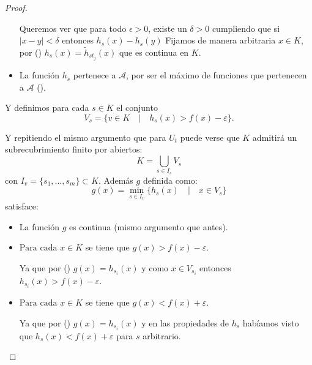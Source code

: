 \begin{proof}
\begin{itemize}
        Queremos ver que para todo $\epsilon > 0$, existe un $\delta >0$ cumpliendo que 
        si $ |x-y| < \delta$ entonces $h_s(x)-h_s(y)$
        Fijamos de manera arbitraria $x \in K$, 
        por 
        () 
        $h_s(x) =  \tilde{h}_{s t_j}(x)$ que es continua en $K$. 

        \item La función $h_s$ pertenece a $\mathcal{A}$, por ser el máximo de funciones que pertenecen a $\mathcal{A}$ (). 
    \end{itemize} 
     

    Y definimos para cada $s \in K$ el conjunto 
    \begin{equation}\label{subrecubrimiento_s}
        V_s = \{
            v \in K  \quad |  \quad
            h_s(x) > f(x) - \varepsilon
            \}.
    \end{equation} 

    Y repitiendo el mismo argumento que para $U_t$ puede verse que $K$ admitirá un 
    subrecubrimiento finito por abiertos: 
    \begin{equation*}
        K = \bigcup_{s \in I_s} V_s
    \end{equation*}
    con $I_v = \{s_1, \ldots, s_m\} \subset K$. 
    Además $g$ definida como: 
    \begin{equation}
        g(x)= \min_{s \in I_v}
        \{ 
            h_{s}(x) 
            \quad | \quad
            x \in V_s
        \} 
    \end{equation}
    satisface:  
    \begin{itemize}
        \item La función $g$ es continua (mismo argumento que antes). 
        \item $\text{Para cada } x \in K$ se tiene que $g(x) >f(x) - \varepsilon$.
        
        Ya que por 
        () 
        $g(x) =  h_{s_i}(x)$ y 
        como $x \in V_{s_i}$ entonces 
        $h_{s_i}(x) > f(x) -\varepsilon$.
        \item $\text{Para cada } x \in K$ se tiene que $g(x) <f(x) +\varepsilon$.
        
        Ya que por 
        () 
        $g(x) =  h_{s_i}(x)$ y 
        en las propiedades de $h_s$ habíamos visto que
        $h_{s}(x) < f(x) +\varepsilon$ para $s$ arbitrario.


\end{itemize}
\end{proof}
